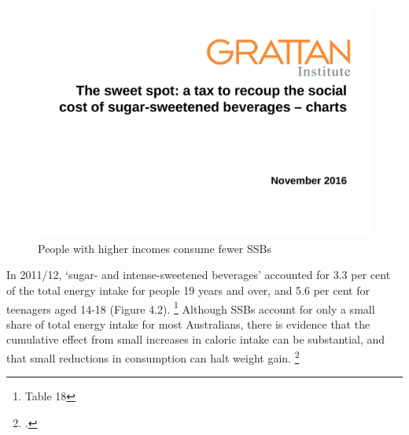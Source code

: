 \documentclass[embargoed]{grattan}
\begin{document}
\begin{figure}
\caption{People with higher incomes consume fewer SSBs}

\includegraphics[page=8]{atlas/ObesityCharts}


\end{figure}

In 2011/12, `sugar- and intense-sweetened beverages' accounted for 3.3 per cent of the total energy intake for people 19 years and over, and 5.6 per cent for teenagers aged 14-18 (Figure 4.2).%
\footnote{\textcite{ABS20144364055007AustralianHealth} Table 18} Although SSBs account for only a small share of total energy intake for most Australians, there is evidence that the cumulative effect from small increases in caloric intake can be substantial, and that small reductions in consumption can halt weight gain.%
\footcites{Fletcher2011Aresoftdrink}{Cutler2003WhyhaveAmericans}
\end{document}
